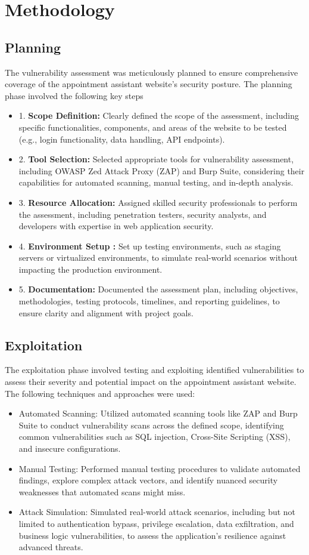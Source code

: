 \documentclass[openany]{report}
\begin{document}
\chapter{Methodology}
\section{Planning}
The vulnerability assessment was meticulously planned to ensure comprehensive coverage of the appointment assistant website's security posture. The planning phase involved the following key steps
\begin{itemize}
    \item 1. \textbf{Scope Definition:} Clearly defined the scope of the assessment, including specific functionalities, components, and areas of the website to be tested (e.g., login functionality, data handling, API endpoints).
    \item 2. \textbf{Tool Selection:} Selected appropriate tools for vulnerability assessment, including OWASP Zed Attack Proxy (ZAP) and Burp Suite, considering their capabilities for automated scanning, manual testing, and in-depth analysis.
    \item 3. \textbf{Resource Allocation:} Assigned skilled security professionals to perform the assessment, including penetration testers, security analysts, and developers with expertise in web application security.
    \item 4. \textbf{Environment Setup :} Set up testing environments, such as staging servers or virtualized environments, to simulate real-world scenarios without impacting the production environment.
    \item 5. \textbf{Documentation:} Documented the assessment plan, including objectives, methodologies, testing protocols, timelines, and reporting guidelines, to ensure clarity and alignment with project goals.
\end{itemize}
\section{Exploitation}
The exploitation phase involved testing and exploiting identified vulnerabilities to assess their severity and potential impact on the appointment assistant website. The following techniques and approaches were used:
\begin{itemize}
    \item Automated Scanning: Utilized automated scanning tools like ZAP and Burp Suite to conduct vulnerability scans across the defined scope, identifying common vulnerabilities such as SQL injection, Cross-Site Scripting (XSS), and insecure configurations.
    \item Manual Testing: Performed manual testing procedures to validate automated findings, explore complex attack vectors, and identify nuanced security weaknesses that automated scans might miss.
    \item Attack Simulation: Simulated real-world attack scenarios, including but not limited to authentication bypass, privilege escalation, data exfiltration, and business logic vulnerabilities, to assess the application's resilience against advanced threats.
\end{itemize}
\end{document}
